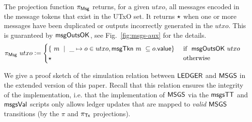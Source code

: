 The projection function
$\pi_{\mathsf{Msg}}$ returns, for a given $utxo$, all messages encoded in
the message tokens that exist in the UTxO set. It
returns $\star$ when one or more messages have been duplicated or outputs
incorrectly generated in the $utxo$. This is guaranteed by $\mathsf{msgOutsOK}$,
see Fig.~\ref{fig:msgs-aux} for the details.
\begin{align*}
  \pi_{\mathsf{Msg}}~utxo &\mathrel{\mathop:}= \begin{cases}
    \{~m~\mid~\_\mapsto o \in utxo, \mathsf{msgTkn}~m~ \subseteq o.\mathsf{value} \} & \text{ if } ~\mathsf{msgOutsOK}~utxo \\
    \star & \text{ otherwise }
  \end{cases}
\end{align*}

We give a proof sketch of the simulation relation between $\mathsf{LEDGER}$
and $\mathsf{MSGS}$ in the extended version of this paper. Recall that this relation
ensures the integrity of the implementation,
i.e. that the implementation of $\mathsf{MSGS}$ via the $\mathsf{msgsTT}$
and $\mathsf{msgsVal}$ scripts only allows ledger updates that are mapped to \emph{valid} $\mathsf{MSGS}$
transitions (by the $\pi$ and $\pi_{\mathsf{Tx}}$ projections).
%
